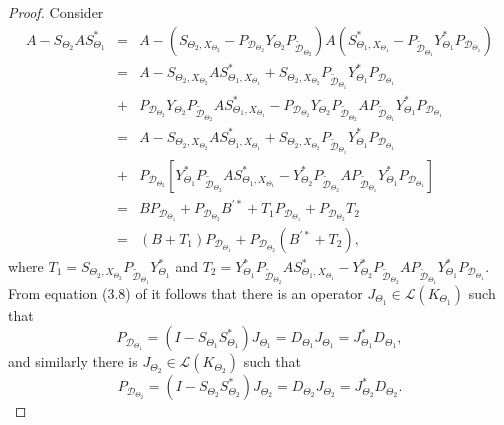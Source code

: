 \documentclass[11pt]{amsart}
\numberwithin{equation}{section}
\theoremstyle{definition}
\numberwithin{equation}{section}
\begin{document}
\begin{proof}
Consider
\begin{eqnarray*}
 A-S_{\Theta_2}AS_{\Theta_1}^*& =& 	 A-(S_{\Theta_2, X_{\Theta_{2}}}-P_{\mathcal{D}_{\Theta_2}}Y_{\Theta_2}P_{\widetilde{\mathcal{D}}_{\Theta_2}})A
 (S_{\Theta_1,X_{\Theta_{1}}}^*-P_{\widetilde{\mathcal{D}}_{\Theta_1}}Y_{\Theta_1}^*P_{\mathcal{D}_{\Theta_1}})\\
 & =& 	A-S_{\Theta_2,X_{\Theta_{2}}}AS_{\Theta_1,X_{\Theta_{1}}}^*+S_{\Theta_{2},X_{\Theta_{2}}}
 P_{\widetilde{\mathcal{D}}_{\Theta_{1}}}Y_{\Theta_{1}}^{*}P_{\mathcal{D}_{\Theta_{1}}}\\
 &+&
 P_{\mathcal{D}_{\Theta_{2}}}Y_{\Theta_{2}}P_{\widetilde{\mathcal{D}}_{\Theta_{2}}}AS_{\Theta_{1},X_{\Theta_{1}}}^{*}
 -P_{\mathcal{D}_{\Theta_{2}}}Y_{\Theta_{2}}P_{\widetilde{\mathcal{D}}_{\Theta_{2}}}A
 P_{\widetilde{\mathcal{D}}_{\Theta_{1}}}Y_{\Theta_{1}}^{*}P_{\mathcal{D}_{\Theta_{1}}}\\
 & =& 	A-S_{\Theta_2,X_{\Theta_{2}}}AS_{\Theta_1,X_{\Theta_{1}}}^*+S_{\Theta_{2},X_{\Theta_{2}}}
 P_{\widetilde{\mathcal{D}}_{\Theta_{1}}}Y_{\Theta_{1}}^{*}P_{\mathcal{D}_{\Theta_{1}}}\\
 &+&P_{\mathcal{D}_{\Theta_{2}}}[Y_{\Theta_{1}}^{*}P_{\widetilde{\mathcal{D}}_{\Theta_{2}}}AS_{\Theta_{1},X_{\Theta_{1}}}^{*}
 -Y_{\Theta_{2}}^{*}P_{\widetilde{\mathcal{D}}_{\Theta_{2}}}A
 P_{\widetilde{\mathcal{D}}_{\Theta_{1}}}Y_{\Theta_{1}}^{*}P_{\mathcal{D}_{\Theta_{1}}}]\\
 & =& BP_{\mathcal{D}_{\Theta_{1}}}+P_{\mathcal{D}_{\Theta_{2}}}B^{\prime *}+T_{1}P_{\mathcal{D}_{\Theta_{1}}}+P_{\mathcal{D}_{\Theta_{2}}}T_{2}\\
 &=&(B+T_{1})P_{\mathcal{D}_{\Theta_{1}}}+P_{\mathcal{D}_{\Theta_{2}}}(B^{\prime*}+T_{2}),
 \end{eqnarray*}	
where $T_1=S_{\Theta_{2},X_{\Theta_{2}}}
 P_{\widetilde{{}\mathcal{D}}_{\Theta_{1}}}Y_{\Theta_{1}}^{*}$ and $T_2=Y_{\Theta_{1}}^{*}P_{\widetilde{\mathcal{D}}_{\Theta_{2}}}AS_{\Theta_{1},X_{\Theta_{1}}}^{*}
 -Y_{\Theta_{2}}^{*}P_{\widetilde{\mathcal{D}}_{\Theta_{2}}}AP_{\widetilde{\mathcal{D}}_{\Theta_{1}}}Y_{\Theta_{1}}^{*}P_{\mathcal{D}_{\Theta_{1}}}.$ From equation (3.8) of \cite{KT} it follows that there is an operator $J_{\Theta_{1}}\in \mathcal{L}(K_{\Theta_{1}})$ such that  $$P_{\mathcal{D}_{\Theta_{1}}}=(I-S_{\Theta_{1}}S_{\Theta_{1}}^*)J_{\Theta_{1}}=D_{\Theta_{1}}J_{\Theta_{1}}=J_{\Theta_{1}}^*D_{\Theta_{1}},$$
  and similarly there is $J_{\Theta_{2}}\in \mathcal{L}(K_{\Theta_{2}})$ such that
  $$P_{\mathcal{D}_{\Theta_{2}}}=(I-S_{\Theta_{2}}S_{\Theta_{2}}^*)J_{\Theta_{2}}=D_{\Theta_{2}}J_{\Theta_{2}}=J_{\Theta_{2}}^*D_{\Theta_{2}}.$$

\end{proof}
\end{document}
